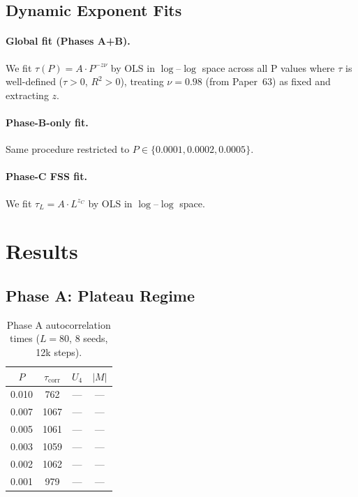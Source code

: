 \documentclass[12pt,a4paper]{article}
\begin{document}
\subsection{Dynamic Exponent Fits}

\paragraph{Global fit (Phases A+B).}
We fit $\tau(P) = A \cdot P^{-z\nu}$ by OLS in $\log$--$\log$ space across
all P values where $\tau$ is well-defined ($\tau>0$, $R^2>0$), treating $\nu = 0.98$
(from Paper~63) as fixed and extracting $z$.

\paragraph{Phase-B-only fit.}
Same procedure restricted to $P \in \{0.0001, 0.0002, 0.0005\}$.

\paragraph{Phase-C FSS fit.}
We fit $\tau_L = A \cdot L^{z_C}$ by OLS in $\log$--$\log$ space.

\section{Results}

\subsection{Phase A: Plateau Regime}

\begin{table}[h]
\centering
\caption{Phase A autocorrelation times ($L=80$, 8 seeds, 12k steps).}
\begin{tabular}{cccc}
\toprule
$P$ & $\tau_\mathrm{corr}$ & $U_4$ & $|M|$ \\
\midrule
0.010 & 762  & --- & --- \\
0.007 & 1067 & --- & --- \\
0.005 & 1061 & --- & --- \\
0.003 & 1059 & --- & --- \\
0.002 & 1062 & --- & --- \\
0.001 & 979  & --- & --- \\
\bottomrule
\end{tabular}
\label{tab:phaseA}
\end{table}
\end{document}
